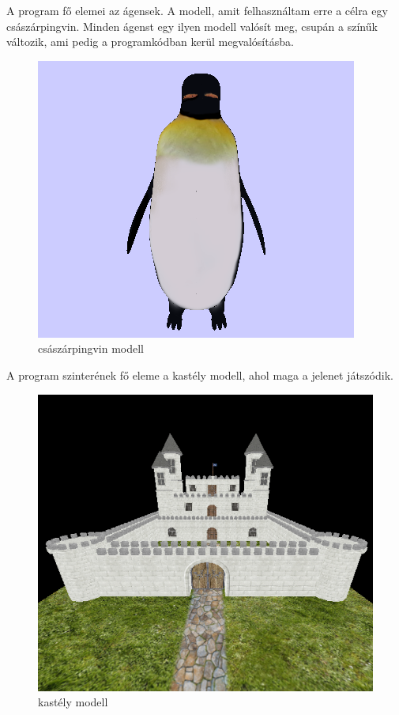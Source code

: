 A program fő elemei az ágensek. 
A modell, amit felhasználtam erre a célra egy császárpingvin. 
Minden ágenst egy ilyen modell valósít meg, csupán a színűk változik, ami pedig a programkódban kerül megvalósításba. \\
\begin{figure}[htp]
    \centering
   	\includegraphics[width=4truecm, height=3truecm]{images/pingvin.png}
	\caption{császárpingvin modell}
\end{figure}

A program szinterének fő eleme a kastély modell, ahol maga a jelenet játszódik.
\begin{figure}[htp]
    \centering
   	\includegraphics[width=4truecm, height=3truecm]{images/castle.png}
	\caption{kastély modell}
\end{figure}

